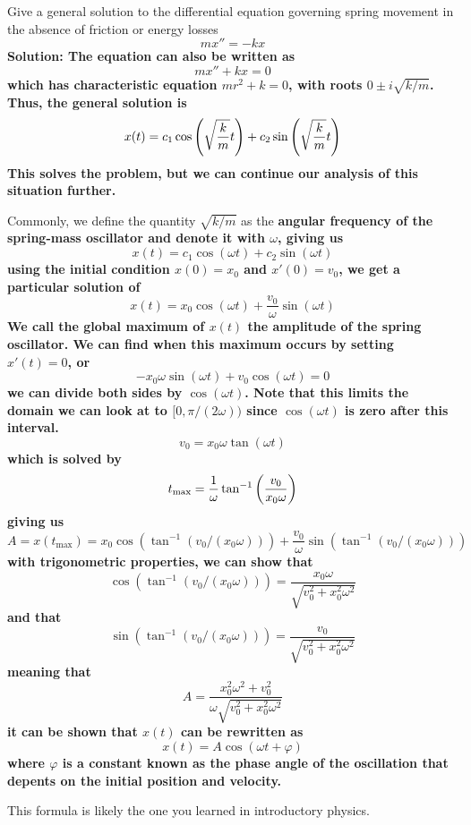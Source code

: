 \begin{example}
    Give a general solution to the differential equation governing spring movement in the absence of friction or energy losses
    \[ mx'' = -kx \]
    \bf{Solution:} The equation can also be written as
    \[ mx'' + kx = 0\]
    which has characteristic equation $mr^2 + k = 0$, with roots $0 \pm i\sqrt{k/m}$. Thus, the general solution is
    \[ x(t) = c_1\cos\pqty{\sqrt{\frac{k}{m}}t} + c_2\sin \pqty{\sqrt{\frac{k}{m}}t}\]
    This solves the problem, but we can continue our analysis of this situation further. \par
    Commonly, we define the quantity $\sqrt{k/m}$ as the \bf{angular frequency} of the spring-mass oscillator and denote it with $\omega$, giving us
    \[ x(t) = c_1\cos(\omega t) + c_2\sin(\omega t)\]
    using the initial condition $x(0) = x_0$ and $x'(0) = v_0$, we get a particular solution of
    \[ x(t) = x_0\cos(\omega t) + \frac{v_0}{\omega}\sin(\omega t)\]
    We call the global maximum of $x(t)$ the \bf{amplitude} of the spring oscillator. We can find when this maximum occurs by setting $x'(t)=0$, or
    \[ -x_0\omega \sin (\omega t) + v_0\cos(\omega t) = 0\]
    we can divide both sides by $\cos(\omega t)$. Note that this limits the domain we can look at to $[0, \pi /(2\omega))$ since $\cos(\omega t)$ is zero after this interval. 
    \[ v_0 = x_0\omega \tan(\omega t) \]
    which is solved by
    \[ t_{\text{max}} = \frac{1}{\omega}\tan^{-1}\pqty{\frac{v_0}{x_0\omega}}\]
    giving us
    \[ A = x(t_{\text{max}}) = x_0\cos(\tan^{-1}(v_0/(x_0\omega))) + \frac{v_0}{\omega}\sin(\tan^{-1}(v_0/(x_0\omega)))\]
    with trigonometric properties, we can show that 
    \[ \cos(\tan^{-1}(v_0/(x_0\omega))) = \frac{x_0\omega}{\sqrt{v_0^2+x_0^2\omega^2}}\]
    and that
    \[  \sin(\tan^{-1}(v_0/(x_0\omega))) = \frac{v_0}{\sqrt{v_0^2+x_0^2\omega^2}}\]
    meaning that
    \[ A = \frac{x_0^2\omega^2+ v_0^2}{\omega\sqrt{v_0^2+x_0^2\omega^2}}\]
    it can be shown that $x(t)$ can be rewritten as
    \[ x(t) = A\cos(\omega t + \varphi )\]
    where $\varphi$ is a constant known as the \bf{phase angle} of the oscillation that depents on the initial position and velocity.\par 
    This formula is likely the one you learned in introductory physics.
\end{example}
